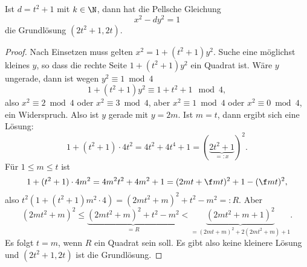 \begin{st} \label{4.23}
	Ist $d = t^2 + 1$ mit $k \in \N$, dann hat die Pellsche Gleichung
	\[
		x^2 - dy^2 = 1
	\]
	die Grundlösung $(2t^2 + 1, 2t)$.
	\begin{proof}
		Nach Einsetzen muss gelten $x^2 = 1 + (t^2 + 1)y^2$.
		Suche eine möglichst kleines $y$, so dass die rechte Seite $1 + (t^2 + 1)y^2$ ein Quadrat ist.
		Wäre $y$ ungerade, dann ist wegen $y^2 \equiv 1 \bmod 4$
		\[
			1 + (t^2 + 1)y^2
			\equiv 1 + t^2 + 1 \mod 4,
		\]
		also $x^2 \equiv 2 \bmod 4$ oder $x^2 \equiv 3 \bmod 4$, aber $x^2 \equiv 1 \bmod 4$ oder $x^2 \equiv 0 \bmod 4$, ein Widerspruch.
		Also ist $y$ gerade mit $y = 2m$.
		Ist $m = t$, dann ergibt sich eine Lösung:
		\[
			1 + (t^2 + 1)\cdot 4t^2
			= 4t^2 + 4t^4 + 1
			= (\underbrace{2t^2 + 1}_{=:x})^2.
		\]
		Für $1 \le m \le t$ ist
		\[
			1 + (t^2 + 1)\cdot 4m^2
			= 4m^2 t^2 + 4m^2 + 1
			= (2mt + \f mt)^2 + 1 - (\f mt)^2,
		\]
		also $t^2(1 + (t^2 + 1)m^2\cdot 4) = (2mt^2 + m)^2 + t^2 - m^2 =: R$.
		Aber
		\[
			(2mt^2 + m)^2
			\le \underbrace{(2mt^2 + m)^2 + t^2 - m^2}_{=R}
			< \underbrace{(2mt^2 + m + 1)^2}_{= (2mt + m)^2 + 2(2mt^2 + m) + 1}.
		\]
		Es folgt $t = m$, wenn $R$ ein Quadrat sein soll.
		Es gibt also keine kleinere Lösung und $(2t^2 + 1, 2t)$ ist die Grundlösung.
	\end{proof}
\end{st}
